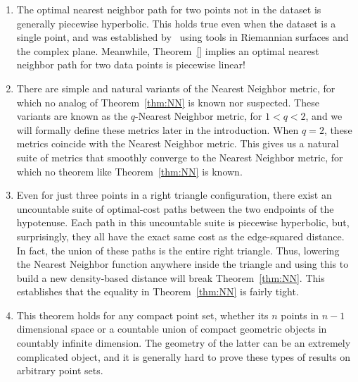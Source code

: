\begin{enumerate}

\item The optimal nearest neighbor path for two points not in the dataset
is generally piecewise hyperbolic. This holds true even when the
dataset is a single point, and was established by~\cite{}
using tools in Riemannian surfaces and the complex plane.
Meanwhile, Theorem~\ref{} implies an optimal nearest
neighbor path for two data points is piecewise linear!

\item There are simple and natural variants of the Nearest Neighbor metric,
for which no analog of Theorem~\ref{thm:NN} is known nor suspected.
These variants are known as the $q$-Nearest Neighbor
metric, for $1 < q < 2$, and we will formally define these
metrics later in the introduction. When $q=2$, these
metrics coincide with the Nearest Neighbor metric.
This
gives us a natural suite of metrics that smoothly converge
to the Nearest Neighbor metric, for which no theorem like
Theorem~\ref{thm:NN} is known.

\item Even for just three points in a right triangle configuration, there
exist an uncountable suite of optimal-cost paths between the two
endpoints of the hypotenuse. Each path in this uncountable
suite is piecewise hyperbolic, but, surprisingly, they all
have the exact same cost as the edge-squared distance. In
fact, the union of these paths is the entire right
triangle. Thus, lowering the Nearest Neighbor function
anywhere inside the triangle and using this to build a new
density-based distance will break
Theorem~\ref{thm:NN}. This establishes that the equality in
Theorem~\ref{thm:NN} is fairly tight.

\item This theorem holds for any compact point set, whether its $n$ points
in $n-1$ dimensional space or a countable union of compact geometric
objects in countably infinite dimension. The geometry of the latter can be
an extremely complicated object, and it is generally hard to prove
these types of results on arbitrary point sets.


\end{enumerate}
